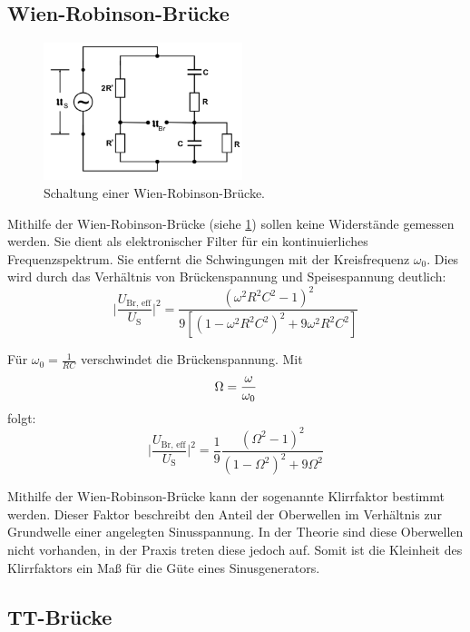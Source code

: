 \subsection{Wien-Robinson-Brücke}

\begin{figure}[h]
  \centering
  \includegraphics[height=4cm]{Grafiken/Wien.pdf}
  \caption{Schaltung einer Wien-Robinson-Brücke. \cite{1}}
  \label{fig:Wien}
\end{figure}

Mithilfe der Wien-Robinson-Brücke (siehe \ref{fig:Wien}) sollen keine Widerstände gemessen werden. Sie dient als elektronischer Filter für ein kontinuierliches Frequenzspektrum. Sie entfernt die Schwingungen mit der Kreisfrequenz $\omega_0$.
Dies wird durch das Verhältnis von Brückenspannung und Speisespannung deutlich:
\begin{equation}
	\biggl | \frac{U_\text{Br, eff}}{U_\text{S}} \biggr |^2 = \frac{(\omega^2R^2C^2 - 1)^2}{9[(1-\omega^2R^2C^2)^2 + 9 \omega^2R^2C^2]}
\end{equation}

Für $\omega_0 = \frac{1}{RC}$ verschwindet die Brückenspannung.
Mit 
\begin{equation}
	\Omega = \frac{\omega}{\omega_0} \notag
\end{equation}
folgt:
\begin{equation}
	\biggl | \frac{U_\text{Br, eff}}{U_\text{S}} \biggr |^2 = \frac{1}{9}\frac{(\Omega^2 - 1)^2}{(1-\Omega^2)^2 + 9\Omega^2}
\end{equation}

Mithilfe der Wien-Robinson-Brücke kann der sogenannte Klirrfaktor bestimmt werden. Dieser Faktor beschreibt den Anteil der Oberwellen im Verhältnis zur Grundwelle einer angelegten Sinusspannung. In der Theorie sind diese Oberwellen nicht vorhanden, in der Praxis treten diese jedoch auf. Somit ist die Kleinheit des Klirrfaktors ein Maß für die Güte eines Sinusgenerators. 

\subsection{TT-Brücke}

